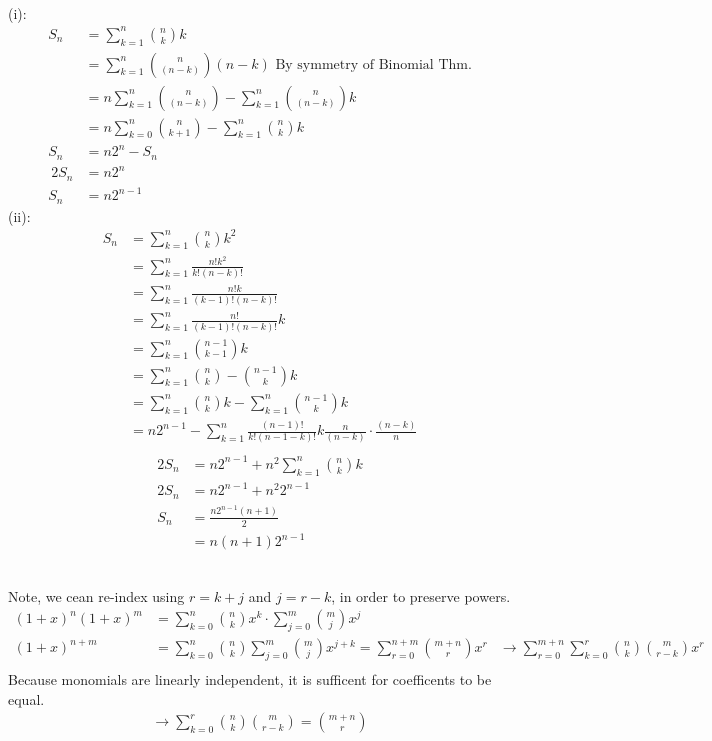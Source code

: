 \documentclass[letterpaper,12pt]{article}
\theoremstyle{definition}
\begin{document}
\\
(i):
\begin{align*}
    S_n & = \sum^n _{k=1} \binom nk k \\
    & =  \sum^n _{k=1} \binom n {(n-k)} (n-k) \text{    
        By symmetry of Binomial Thm.}\\
    & =  n\sum^n _{k=1} \binom n {(n-k)} - \sum^n _{k=1} \binom n {(n-k)} k \\
    & =  n\sum^n _{k=0} \binom n {k+1} - \sum^n _{k=1} \binom n {k} k \\
    S_n & = n2^n - S_n \\
    ~2 S_n & = n2^n \\
    S_n & = n2^{n-1}
\end{align*}
(ii):
\begin{align*}
    S_n & = \sum^n _{k=1} \binom nk k^2 \\
    & = \sum^n _{k=1} \frac{n!k^2}{k!(n-k)!} \\
    & = \sum^n _{k=1} \frac{n!k}{(k-1)!(n-k)!} \\
    & = \sum^n _{k=1} \frac{n!}{(k-1)!(n-k)!}k \\
    & = \sum^n _{k=1} \binom {n-1}{k-1} k \\
    & = \sum^n _{k=1} \binom {n}{k} - \binom {n-1}{k} k \\
    & = \sum^n _{k=1} \binom {n}{k}k - \sum ^n _{k=1} \binom {n-1}{k} k \\
    & = n2^{n-1} - \sum ^n _{k=1} \frac{(n-1)!}{k!(n-1-k)!} k \frac{n}{
        (n-k)} \cdot \frac{(n-k)}{n} \\
\end{align*}
\begin{align*}
    2S_n & =  n2^{n-1} + n^2\sum^n _{k=1} \binom {n}{k}k \\
    2 S_n& =  n2^{n-1} +  n^2 2^{n-1} \\
    S_n & = \frac{n2^{n-1}(n+1)}{2} \\
    & = n(n+1)2^{n-1}
\end{align*}

\\
Note, we cean re-index using $r=k+j$ and $j=r-k$, in order to preserve powers.
\begin{align*}
    (1+x)^n(1+x)^m & = \sum^n _{k=0} \binom nk x^k \cdot 
        \sum^m _{j=0} \binom mj x^j \\
    (1+x)^{n+m} & = \sum_{k=0}^n \binom nk \sum_{j=0}^m \binom mj x^{j+k}
    = \sum ^{n+m} _{r=0} \binom {m+n}{r} x^r
    & \rightarrow \sum^{m+n}_{r=0} \sum^r_{k=0} \binom nk \binom m{r-k} x^r \\
\end{align*}
Because monomials are linearly independent, it is sufficent for 
    coefficents to be equal.\\
\begin{align*}
    \rightarrow \sum^r_{k=0} \binom nk \binom m{r-k} = \binom{m+n}r
\end{align*} 
\end{document}
